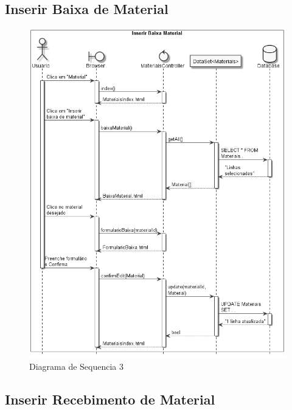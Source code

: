 \documentclass[rascunho,xindy,acronym,symbols]{fei}
\begin{document}
\subsection{Inserir Baixa de Material}

\begin{figure}[H]
    \centering
    \includegraphics[width=\textwidth]{./Images/DS_Inserir_Baixa_Material.jpg}
    \caption{Diagrama de Sequencia 3}
    \label{fig:diag_seq3}
\end{figure}

\subsection{Inserir Recebimento de Material}
\end{document}
